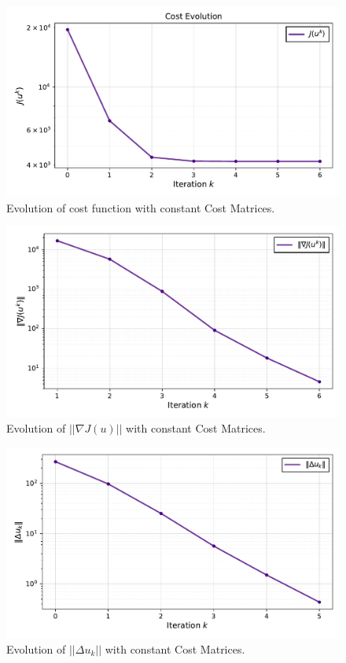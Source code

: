 \clearpage

\begin{figure}[htb]
    \centering
    \includegraphics[width=1\linewidth]{img/2-task2/cost_const.pdf}
    \caption{Evolution of cost function with constant Cost Matrices.}
    \label{fig:J_const}
\end{figure}

\begin{figure}[htb]
    \centering
    \includegraphics[width=1\linewidth]{img/2-task2/gradJ_const.pdf}
    \caption{Evolution of $||\nabla J(u)||$ with constant Cost Matrices.}
    \label{fig:NormJ_const}
\end{figure}

\begin{figure}[htb]
    \centering
    \includegraphics[width=1\linewidth]{img/2-task2/delta_u_const.pdf}
    \caption{Evolution of $||\Delta u_k||$ with constant Cost Matrices.}
    \label{fig:normdu_const}
\end{figure}
